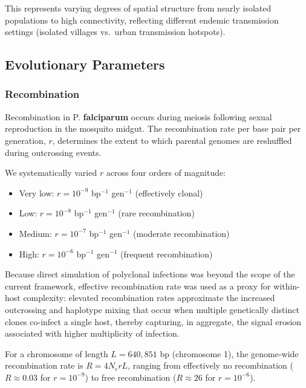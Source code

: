 \documentclass[
  11pt,
]{article}
\providecommand{\tightlist}{%
  \setlength{\itemsep}{0pt}\setlength{\parskip}{0pt}}
\begin{document}
This represents varying degrees of spatial structure from nearly
isolated populations to high connectivity, reflecting different endemic
transmission settings (isolated villages vs.~urban transmission
hotspots).

\subsection{Evolutionary Parameters}\label{evolutionary-parameters}

\subsubsection{Recombination}\label{recombination}

Recombination in P. \textbf{falciparum} occurs during meiosis following
sexual reproduction in the mosquito midgut. The recombination rate per
base pair per generation, \(r\), determines the extent to which parental
genomes are reshuffled during outcrossing events.

We systematically varied \(r\) across four orders of magnitude:

\begin{itemize}
\tightlist
\item
  Very low: \(r = 10^{-9}\) bp\(^{-1}\) gen\(^{-1}\) (effectively
  clonal)
\item
  Low: \(r = 10^{-8}\) bp\(^{-1}\) gen\(^{-1}\) (rare recombination)
\item
  Medium: \(r = 10^{-7}\) bp\(^{-1}\) gen\(^{-1}\) (moderate
  recombination)
\item
  High: \(r = 10^{-6}\) bp\(^{-1}\) gen\(^{-1}\) (frequent
  recombination)
\end{itemize}

Because direct simulation of polyclonal infections was beyond the scope
of the current framework, effective recombination rate was used as a
proxy for within-host complexity: elevated recombination rates
approximate the increased outcrossing and haplotype mixing that occur
when multiple genetically distinct clones co-infect a single host,
thereby capturing, in aggregate, the signal erosion associated with
higher multiplicity of infection.

For a chromosome of length \(L = 640,851\) bp (chromosome 1), the
genome-wide recombination rate is \(R = 4N_e r L\), ranging from
effectively no recombination (\(R \approx 0.03\) for \(r = 10^{-9}\)) to
free recombination (\(R \approx 26\) for \(r = 10^{-6}\)).
\end{document}

